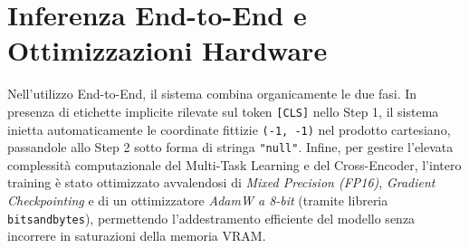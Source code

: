 \documentclass[10pt,a4paper]{report}
\begin{document}
\section{Inferenza End-to-End e Ottimizzazioni Hardware}
Nell'utilizzo End-to-End, il sistema combina organicamente le due fasi. In presenza di etichette implicite rilevate sul token \texttt{[CLS]} nello Step 1, il sistema inietta automaticamente le coordinate fittizie \texttt{(-1, -1)} nel prodotto cartesiano, passandole allo Step 2 sotto forma di stringa \texttt{"null"}.
Infine, per gestire l'elevata complessità computazionale del Multi-Task Learning e del Cross-Encoder, l'intero training è stato ottimizzato avvalendosi di \textit{Mixed Precision (FP16)}, \textit{Gradient Checkpointing} e di un ottimizzatore \textit{AdamW a 8-bit} (tramite libreria \texttt{bitsandbytes}), permettendo l'addestramento efficiente del modello senza incorrere in saturazioni della memoria VRAM.
\end{document}
